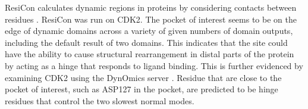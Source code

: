 ResiCon calculates dynamic regions in proteins by considering contacts between residues \cite{Dziubinski2016}.
ResiCon was run on CDK2.
The pocket of interest seems to be on the edge of dynamic domains across a variety of given numbers of domain outputs, including the default result of two domains.
This indicates that the site could have the ability to cause structural rearrangement in distal parts of the protein by acting as a hinge that responds to ligand binding.
This is further evidenced by examining CDK2 using the DynOmics server \cite{Li2017}.
Residue that are close to the pocket of interest, such as ASP127 in the pocket, are predicted to be hinge residues that control the two slowest normal modes.






